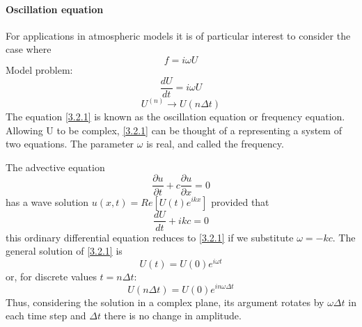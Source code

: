 \paragraph{Oscillation equation}
For applications in atmospheric models it is of particular interest to consider the case where $$f=i\omega U$$
Model problem:
\begin{equation}\label{3.2.1}
    \frac{dU}{dt}=i\omega U
\end{equation}
$$U^{(n)}\rightarrow U(n\Delta t)$$
The equation \ref{3.2.1} is known as the oscillation equation or frequency equation. Allowing U to be complex, \ref{3.2.1} can be thought of a representing a system of two equations. The parameter $\omega$ is real, and called the frequency. 

The advective equation $$\frac{\partial u}{\partial t}+c\frac{\partial u}{\partial x}=0$$
has a wave solution $u(x,t)=Re[U(t)e^{ikx}]$ provided that
$$\frac{dU}{dt}+ikc=0$$
this ordinary differential equation reduces to \ref{3.2.1} if we substitute $\omega=-kc$.
The general solution of \ref{3.2.1} is 
$$U(t)=U(0)e^{i\omega t}$$
or, for discrete values $t=n\Delta t$:
\begin{equation}
    U(n\Delta t)=U(0)e^{in\omega\Delta t}
\end{equation}
Thus, considering the solution in a complex plane, its argument rotates by $\omega\Delta t$ in each time step and $\Delta t$ there is no change in amplitude.

